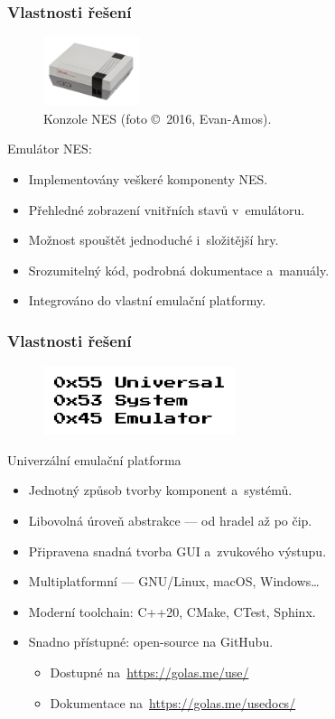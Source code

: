 \documentclass{beamer}
\begin{document}
\begin{frame}
	\frametitle{Vlastnosti řešení}
	\begin{figure}
		\centering
		\includegraphics[width=0.25\textwidth]{images/nes.jpg}
		\caption{Konzole NES (foto \copyright~2016, Evan-Amos).}
	\end{figure}
	Emulátor NES:
	\begin{itemize}
		\item Implementovány veškeré komponenty NES.
		\pause
		\item Přehledné zobrazení vnitřních stavů v~emulátoru.
		\pause
		\item Možnost spouštět jednoduché i~složitější hry.
		\pause
		\item Srozumitelný kód, podrobná dokumentace a~manuály.
		\pause
		\item Integrováno do vlastní emulační platformy.
	\end{itemize}
\end{frame}

\begin{frame}
	\frametitle{Vlastnosti řešení}
	\begin{figure}
		\centering
		\includegraphics[width=0.5\textwidth]{images/logo-full-path.pdf}
	\end{figure}
	Univerzální emulační platforma
	\begin{itemize}
		\item Jednotný způsob tvorby komponent a~systémů.
		\pause
		\item Libovolná úroveň abstrakce --- od hradel až po čip.
		\pause
		\item Připravena snadná tvorba GUI a~zvukového výstupu.
		\pause
		\item Multiplatformní --- GNU/Linux, macOS, Windows\dots
		\pause
		\item Moderní toolchain: C++20, CMake, CTest, Sphinx.
		\pause
		\item Snadno přístupné: open-source na GitHubu.
		\begin{itemize}
			\item Dostupné na~\url{https://golas.me/use/}
			\item Dokumentace na~\url{https://golas.me/usedocs/}
		\end{itemize}
	\end{itemize}
\end{frame}
\end{document}
